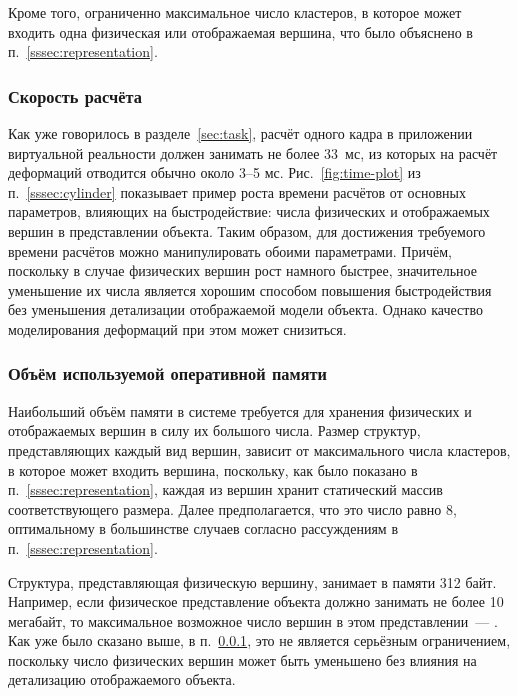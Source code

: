 \documentclass[a4paper, 14pt, titlepage]{extarticle}
\newcommand{\num}[1]{\numprint{#1}}
\begin{document}
      Кроме того, ограниченно максимальное число кластеров, в которое может входить одна физическая
      или отображаемая вершина, что было объяснено в п.~\ref{sssec:representation}.

      \subsubsection{Скорость расчёта}\label{sssec:speed_limit}

        Как уже говорилось в разделе~\ref{sec:task}, расчёт одного кадра в приложении виртуальной реальности должен
        занимать не более 33~мс, из которых на расчёт деформаций отводится обычно около 3--5 мс. Рис.~\ref{fig:time-plot}
        из п.~\ref{sssec:cylinder} показывает пример роста времени расчётов от основных параметров,
        влияющих на быстродействие: числа физических и отображаемых вершин в представлении объекта.
        Таким образом, для достижения требуемого времени расчётов можно манипулировать обоими
        параметрами. Причём, поскольку в случае физических вершин рост намного быстрее, значительное
        уменьшение их числа является хорошим способом повышения быстродействия без уменьшения
        детализации отображаемой модели объекта. Однако качество моделирования деформаций при этом
        может снизиться.

      \subsubsection{Объём используемой оперативной памяти}

        Наибольший объём памяти в системе требуется для хранения физических и отображаемых вершин в
        силу их большого числа. Размер структур, представляющих каждый вид вершин, зависит от
        максимального числа кластеров, в которое может входить вершина, поскольку, как было показано
        в п.~\ref{sssec:representation}, каждая из вершин хранит статический массив соответствующего
        размера. Далее предполагается, что это число равно 8, оптимальному в большинстве случаев
        согласно рассуждениям в п.~\ref{sssec:representation}.

        Структура, представляющая физическую вершину, занимает в памяти 312 байт. Например, если
        физическое представление объекта должно занимать не более 10 мегабайт, то максимальное
        возможное число вершин в этом представлении~--- \num{32051}. Как уже было сказано выше,
        в п.~\ref{sssec:speed_limit}, это не
        является серьёзным ограничением, поскольку число физических вершин может быть уменьшено без
        влияния на детализацию отображаемого объекта.
\end{document}
